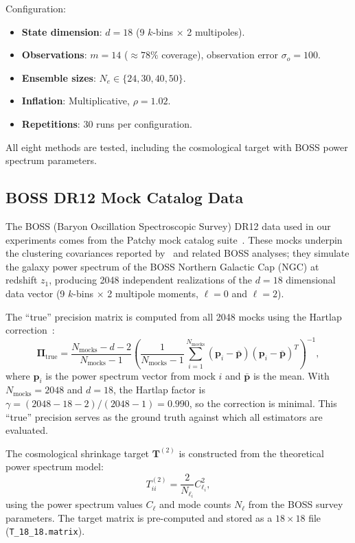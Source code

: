Configuration:
\begin{itemize}
\item \textbf{State dimension}: $d = 18$ (9 $k$-bins $\times$ 2 multipoles).
\item \textbf{Observations}: $m = 14$ ($\approx 78\%$ coverage), observation error $\sigma_o = 100$.
\item \textbf{Ensemble sizes}: $N_e \in \{24, 30, 40, 50\}$.
\item \textbf{Inflation}: Multiplicative, $\rho = 1.02$.
\item \textbf{Repetitions}: 30 runs per configuration.
\end{itemize}

All eight methods are tested, including the cosmological target with BOSS power spectrum parameters.

\subsection{BOSS DR12 Mock Catalog Data}
\label{sec:boss_data}

The BOSS (Baryon Oscillation Spectroscopic Survey) DR12 data used in our experiments comes from the Patchy mock catalog suite~\citep{looijmans2024comparison}. These mocks underpin the clustering covariances reported by~\citet{percival2014clustering} and related BOSS analyses; they simulate the galaxy power spectrum of the BOSS Northern Galactic Cap (NGC) at redshift $z_1$, producing 2048 independent realizations of the $d = 18$ dimensional data vector (9 $k$-bins $\times$ 2 multipole moments, $\ell = 0$ and $\ell = 2$).

The ``true'' precision matrix is computed from all 2048 mocks using the Hartlap correction~\citep{hartlap2007your}:
\begin{equation}
\label{eq:true_precision}
\boldsymbol{\Pi}_{\text{true}} = \frac{N_{\text{mocks}} - d - 2}{N_{\text{mocks}} - 1} \left(\frac{1}{N_{\text{mocks}} - 1} \sum_{i=1}^{N_{\text{mocks}}} (\mathbf{p}_i - \bar{\mathbf{p}})(\mathbf{p}_i - \bar{\mathbf{p}})^T\right)^{-1},
\end{equation}
where $\mathbf{p}_i$ is the power spectrum vector from mock $i$ and $\bar{\mathbf{p}}$ is the mean. With $N_{\text{mocks}} = 2048$ and $d = 18$, the Hartlap factor is $\gamma = (2048 - 18 - 2)/(2048 - 1) = 0.990$, so the correction is minimal. This ``true'' precision serves as the ground truth against which all estimators are evaluated.

The cosmological shrinkage target $\mathbf{T}^{(2)}$ is constructed from the theoretical power spectrum model:
\begin{equation}
\label{eq:T_cosmo_data}
T^{(2)}_{ii} = \frac{2}{N_{\ell_i}} C_{\ell_i}^2,
\end{equation}
using the power spectrum values $C_\ell$ and mode counts $N_\ell$ from the BOSS survey parameters. The target matrix is pre-computed and stored as a $18 \times 18$ file (\texttt{T\_18\_18.matrix}).

